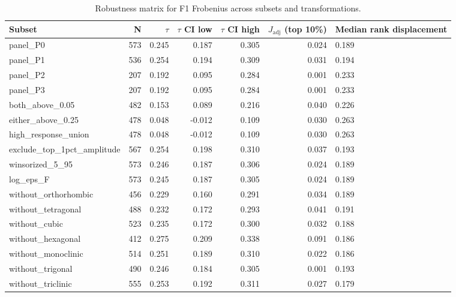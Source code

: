 \begin{table}[t]
\centering
\caption{Robustness matrix for F1 Frobenius across subsets and transformations.}
\label{tab:robustness}
\begin{tabular}{lrrrrr}
\toprule
Subset & N & $\tau$ & $\tau$ CI low & $\tau$ CI high & $J_{\text{adj}}$ (top 10\%) & Median rank displacement \\
\midrule
panel_P0 & 573 & 0.245 & 0.187 & 0.305 & 0.024 & 0.189 \\
panel_P1 & 536 & 0.254 & 0.194 & 0.309 & 0.031 & 0.194 \\
panel_P2 & 207 & 0.192 & 0.095 & 0.284 & 0.001 & 0.233 \\
panel_P3 & 207 & 0.192 & 0.095 & 0.284 & 0.001 & 0.233 \\
both_above_0.05 & 482 & 0.153 & 0.089 & 0.216 & 0.040 & 0.226 \\
either_above_0.25 & 478 & 0.048 & -0.012 & 0.109 & 0.030 & 0.263 \\
high_response_union & 478 & 0.048 & -0.012 & 0.109 & 0.030 & 0.263 \\
exclude_top_1pct_amplitude & 567 & 0.254 & 0.198 & 0.310 & 0.037 & 0.193 \\
winsorized_5_95 & 573 & 0.246 & 0.187 & 0.306 & 0.024 & 0.189 \\
log_eps_F & 573 & 0.245 & 0.187 & 0.305 & 0.024 & 0.189 \\
without_orthorhombic & 456 & 0.229 & 0.160 & 0.291 & 0.034 & 0.189 \\
without_tetragonal & 488 & 0.232 & 0.172 & 0.293 & 0.041 & 0.191 \\
without_cubic & 523 & 0.235 & 0.172 & 0.300 & 0.032 & 0.188 \\
without_hexagonal & 412 & 0.275 & 0.209 & 0.338 & 0.091 & 0.186 \\
without_monoclinic & 514 & 0.251 & 0.189 & 0.310 & 0.022 & 0.186 \\
without_trigonal & 490 & 0.246 & 0.184 & 0.305 & 0.001 & 0.193 \\
without_triclinic & 555 & 0.253 & 0.192 & 0.311 & 0.027 & 0.179 \\
\bottomrule
\end{tabular}
\end{table}
